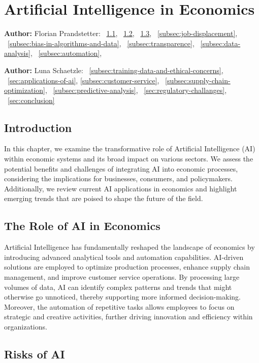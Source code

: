 \chapter{Artificial Intelligence in Economics}
\label{chap:Artificial_Intelligence_in_Economics}
\textbf{Author:} Florian Prandstetter: ~\ref{sec:introduction}, ~\ref{sec:role-of-ai-in-economics}, ~\ref{sec:risks-of-ai}, ~\ref{subsec:job-displacement}, ~\ref{subsec:bias-in-algorithms-and-data}, ~\ref{subsec:transparence}, ~\ref{subsec:data-analysis}, ~\ref{subsec:automation}, 

\textbf{Author:} Luna Schaetzle: ~\ref{subsec:training-data-and-ethical-concerns}, ~\ref{sec:applications-of-ai}, \ref{subsec:customer-service}, ~\ref{subsec:supply-chain-optimization}, ~\ref{subsec:predictive-analysis}, ~\ref{sec:regulatory-challanges}, ~\ref{sec:conclusion}


\section{Introduction}
\label{sec:introduction}

In this chapter, we examine the transformative role of Artificial Intelligence (AI) within economic systems and its broad impact on various sectors. We assess the potential benefits and challenges of integrating AI into economic processes, considering the implications for businesses, consumers, and policymakers. Additionally, we review current AI applications in economics and highlight emerging trends that are poised to shape the future of the field.

\section{The Role of AI in Economics}
\label{sec:role-of-ai-in-economics}

Artificial Intelligence has fundamentally reshaped the landscape of economics by introducing advanced analytical tools and automation capabilities. AI-driven solutions are employed to optimize production processes, enhance supply chain management, and improve customer service operations. By processing large volumes of data, AI can identify complex patterns and trends that might otherwise go unnoticed, thereby supporting more informed decision-making. Moreover, the automation of repetitive tasks allows employees to focus on strategic and creative activities, further driving innovation and efficiency within organizations.

\section{Risks of AI}
\label{sec:risks-of-ai}

